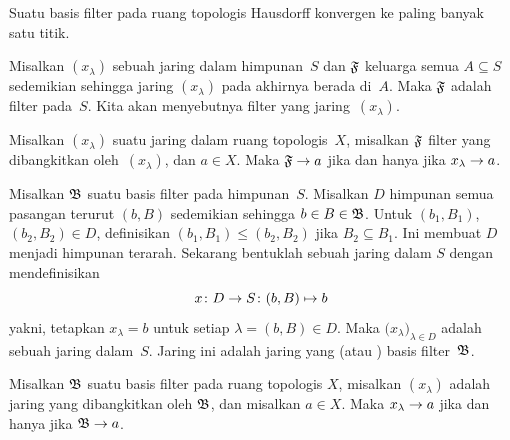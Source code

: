 \begin{prop} Suatu basis filter pada ruang topologis Hausdorff konvergen ke paling banyak satu titik.
\end{prop}

\begin{exam} Misalkan $(x_\lambda)$ sebuah jaring dalam himpunan~$S$ dan $\mathfrak{F}$ keluarga semua $A \subseteq S$ sedemikian sehingga jaring $(x_\lambda)$
pada akhirnya berada di~$A$.  Maka $\mathfrak{F}$ adalah filter pada~$S$.  Kita akan menyebutnya filter yang
 jaring~$(x_\lambda)$.
\end{exam}

\begin{prop} Misalkan $(x_\lambda)$ suatu jaring dalam ruang topologis~$X$, misalkan $\mathfrak{F}$ filter yang dibangkitkan oleh~$(x_\lambda)$,
dan $a \in X$.  Maka $\mathfrak{F} \rightarrow a$ jika dan hanya jika $x_\lambda \rightarrow a$.
\end{prop}

\begin{exam} Misalkan $\mathfrak{B}$ suatu basis filter pada himpunan~$S$.  Misalkan $D$ himpunan semua pasangan terurut $(b,B)$ sedemikian sehingga $b \in B \in \mathfrak{B}$.
Untuk $(b_1,B_1)$, $(b_2,B_2) \in D$, definisikan $(b_1,B_1) \le (b_2,B_2)$ jika $B_2 \subseteq B_1$.  Ini membuat $D$ menjadi himpunan terarah.  Sekarang bentuklah
sebuah jaring dalam $S$ dengan mendefinisikan
   \[ x\colon D \rightarrow S\colon (b,B) \mapsto b \]
yakni, tetapkan $x_\lambda = b$ untuk setiap $\lambda = (b,B) \in D$.  Maka $\bigl(x_\lambda\bigr)_{\lambda \in D}$ adalah sebuah jaring dalam~$S$.  Jaring ini adalah jaring yang
 (atau ) basis filter~$\mathfrak{B}$.
\end{exam}

\begin{prop} Misalkan $\mathfrak{B}$ suatu basis filter pada ruang topologis $X$, misalkan $(x_\lambda)$ adalah jaring yang dibangkitkan oleh $\mathfrak{B}$, dan misalkan $a \in X$.
Maka $x_\lambda \rightarrow a$ jika dan hanya jika $\mathfrak{B} \rightarrow a$.
\end{prop}













